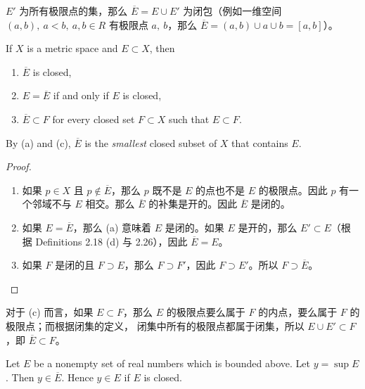 \documentclass[../poma-notes.tex]{subfiles}
\begin{document}
\begin{anote}
  $E'$ 为所有极限点的集，那么 $\overline{E} = E \cup E'$ 为闭包（例如一维空间 $(a, b), \ a<b, \ a,b \in R$ 有极限点
  $a, \ b$，那么 $\overline{E} = (a,b) \cup {a} \cup {b} = [a,b]$）。
\end{anote}

\begin{theorem}
  If $X$ is a metric space and $E \subset X$, then
  \begin{enumerate}[label=(\alph*)]
    \item $\overline{E}$ is closed,
    \item $E = \overline{E}$ if and only if $E$ is closed,
    \item $\overline{E} \subset F$ for every closed set $F \subset X$ such that $E \subset F$.
  \end{enumerate}
  By (a) and (c), $\overline{E}$ is the \textit{smallest} closed subset of $X$ that contains $E$.
\end{theorem}

\begin{proof}
  \begin{enumerate}[label=(\alph*)]
    \item 如果 $p \in X$ 且 $p \notin \overline{E}$，那么 $p$ 既不是 $E$ 的点也不是 $E$ 的极限点。因此 $p$ 有一个邻域不与
          $E$ 相交。那么 $\overline{E}$ 的补集是开的。因此 $\overline{E}$ 是闭的。
    \item 如果 $E = \overline{E}$，那么 (a) 意味着 $E$ 是闭的。如果 $E$ 是开的，那么 $E' \subset E$（根据 Definitions 2.18 (d)
          与 2.26），因此 $\overline{E} = E$。
    \item 如果 $F$ 是闭的且 $F \supset E$，那么 $F \supset F'$，因此 $F \supset E'$。所以 $F \supset \overline{E}$。
  \end{enumerate}
\end{proof}

\begin{anote}
  对于 (c) 而言，如果 $E \subset F$，那么 $E$ 的极限点要么属于 $F$ 的内点，要么属于 $F$ 的极限点；而根据闭集的定义，
  闭集中所有的极限点都属于闭集，所以 $E \cup E' \subset F$，即 $\overline{E} \subset F$。
\end{anote}

\begin{theorem}
  Let $E$ be a nonempty set of real numbers which is bounded above. Let $y = \sup E$. Then $y \in \overline{E}$.
  Hence $y \in E$ if $E$ is closed.
\end{theorem}
\end{document}
